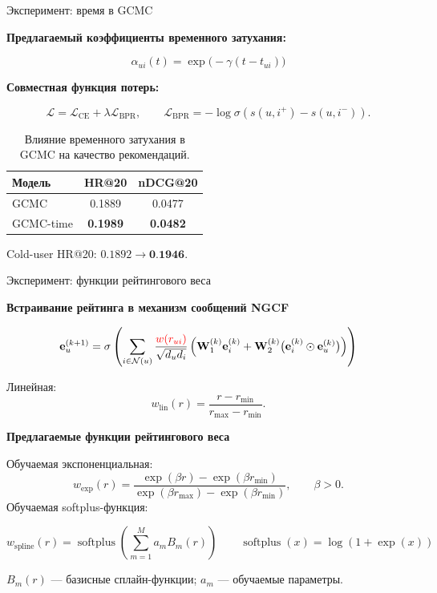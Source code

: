 \documentclass{beamer}
\begin{document}
\begin{frame}{Эксперимент: время в GCMC}
\small

\textbf{Предлагаемый коэффициенты временного затухания:}

$$
  \alpha_{ui}(t)=\exp\big(-\gamma(t-t_{ui})\big)
$$

\vspace{0.45em}

\textbf{Совместная функция потерь:}

$$
  \mathcal{L}=\mathcal{L}_{\mathrm{CE}}+\lambda\mathcal{L}_{\mathrm{BPR}},
  \qquad
  \mathcal{L}_{\mathrm{BPR}}=-\log\sigma(s(u,i^+)-s(u,i^-)).
$$

\vspace{0.6em}

\begin{table}
\centering
\caption{\scriptsize Влияние временного затухания в GCMC на качество рекомендаций.}
\setlength{\tabcolsep}{8pt}
\begin{tabular}{lcc}
\toprule
Модель & HR@20 & nDCG@20 \\
\midrule
GCMC & 0.1889 & 0.0477 \\
GCMC-time & \textbf{0.1989} & \textbf{0.0482} \\
\bottomrule
\end{tabular}
\end{table}

\vspace{0.2em}

\centering
Cold-user HR@20: $0.1892 \rightarrow \textbf{0.1946}$.

\end{frame}

\begin{frame}{Эксперимент: функции рейтингового веса}
\small

\textbf{Встраивание рейтинга в механизм сообщений NGCF}

$$
\mathbf{e}^{(k+1)}_u =
\sigma\left(
\sum_{i\in\mathcal{N}(u)}
\frac{\textcolor{red}{w(r_{ui})}}{\sqrt{d_u d_i}}
\left(
\mathbf{W}^{(k)}_1\mathbf{e}^{(k)}_i
+
\mathbf{W}^{(k)}_2
\big(\mathbf{e}^{(k)}_i \odot \mathbf{e}^{(k)}_u\big)
\right)
\right)
$$

Линейная:
$$
w_{\mathrm{lin}}(r)
=
\frac{r-r_{\min}}{r_{\max}-r_{\min}}.
$$


\textbf{Предлагаемые функции рейтингового веса}

Обучаемая экспоненциальная:
$$
w_{\mathrm{exp}}(r)
=
\frac{\exp(\beta r)-\exp(\beta r_{\min})}
{\exp(\beta r_{\max})-\exp(\beta r_{\min})},
\qquad
\beta>0.
$$
Обучаемая softplus-функция:

$$
w_{\mathrm{spline}}(r)
=
\operatorname{softplus}
\left(
\sum_{m=1}^{M} a_m B_m(r)
\right)
\qquad
\operatorname{softplus}(x)=\log(1+\exp(x))
$$

\footnotesize
$B_m(r)$ — базисные сплайн-функции;
$a_m$ — обучаемые параметры.

\end{frame}
\end{document}
